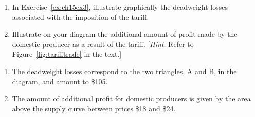\begin{enumialphparenastyle}
\begin{econex}\label{ex:ch15ex4}
\begin{enumerate}
\item   In Exercise~\ref{ex:ch15ex3}, illustrate graphically the deadweight losses associated with the imposition of the tariff.
\item	Illustrate on your diagram the additional amount of profit made by the domestic producer as a result of the tariff. [\textit{Hint}: Refer to Figure~\ref{fig:tarifftrade} in the text.]
\end{enumerate}
\begin{econsolution}
\begin{enumerate}
\item	The deadweight losses correspond to the two triangles, A and B, in the diagram, and amount to \$105.
\item	The amount of additional profit for domestic producers is given by the area above the supply curve between prices \$18 and \$24.
\end{enumerate}
\end{econsolution}
\end{econex}


\end{enumialphparenastyle}
